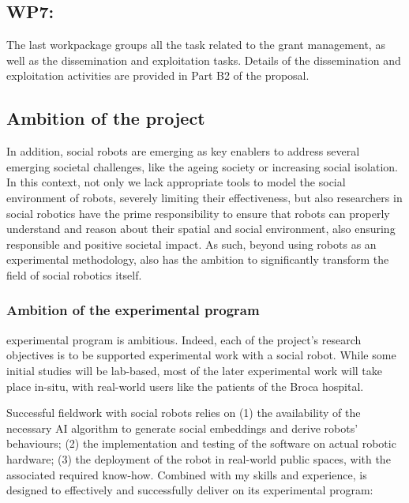 \subsection{WP7: \textbf{\wpSeven}}

The last workpackage groups all the task related to the grant management, as
well as the dissemination and exploitation tasks. Details of the dissemination
and exploitation activities are provided in Part B2 of the proposal.



\subsection{Ambition of the project}

In addition, social robots are emerging as key enablers to address several
emerging societal challenges, like the ageing society or increasing social
isolation. In this context, not only we lack appropriate tools to model the
social environment of robots, severely limiting their effectiveness, but also
researchers in social robotics have the prime responsibility to ensure that
robots can properly understand and reason about their spatial and social
environment, also ensuring responsible and positive societal impact. As such,
beyond using robots as an experimental methodology, \project also has the
ambition to significantly transform the field of social robotics itself.


\subsubsection{Ambition of the experimental program}

\project experimental program is ambitious. Indeed, each of the project's
research objectives is to be supported experimental work with
a social robot. While some initial studies will be lab-based, most of the later
experimental work will take place in-situ, with real-world users like the
patients of the Broca hospital.

Successful fieldwork with social robots relies on (1) the availability of
the necessary AI algorithm to generate social embeddings and derive robots'
behaviours; (2) the implementation and testing of the software on actual robotic
hardware; (3) the deployment of the robot in real-world public spaces, with the
associated required know-how. Combined with my skills and experience, \project
is designed to effectively and successfully deliver on its experimental program:

